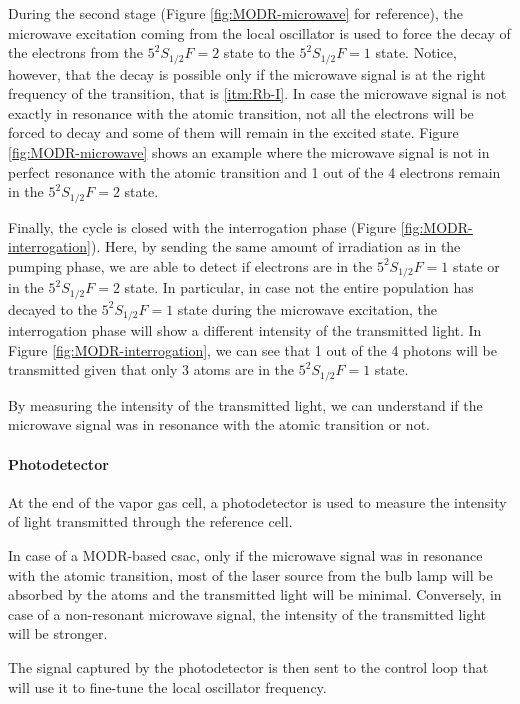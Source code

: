 During the second stage (Figure \ref{fig:MODR-microwave} for reference), the microwave excitation coming from the local oscillator is used to force the decay of the electrons from the $5^2S_{1/2} F=2$ state to the $5^2S_{1/2} F=1$ state.
Notice, however, that the decay is possible only if the microwave signal is at the right frequency of the transition, that is \ref{itm:Rb-I}.
In case the microwave signal is not exactly in resonance with the atomic transition, not all the electrons will be forced to decay and some of them will remain in the excited state.
Figure \ref{fig:MODR-microwave} shows an example where the microwave signal is not in perfect resonance with the atomic transition and 1 out of the 4 electrons remain in the $5^2S_{1/2} F=2$ state.

Finally, the cycle is closed with the interrogation phase (Figure \ref{fig:MODR-interrogation}).
Here, by sending the same amount of irradiation as in the pumping phase, we are able to detect if electrons are in the $5^2S_{1/2} F=1$ state or in the $5^2S_{1/2} F=2$ state.
In particular, in case not the entire population has decayed to the $5^2S_{1/2} F=1$ state during the microwave excitation, the interrogation phase will show a different intensity of the transmitted light.
In Figure \ref{fig:MODR-interrogation}, we can see that 1 out of the 4 photons will be transmitted given that only 3 atoms are in the $5^2S_{1/2} F=1$ state.

By measuring the intensity of the transmitted light, we can understand if the microwave signal was in resonance with the atomic transition or not.


\paragraph{Photodetector}

At the end of the vapor gas cell, a photodetector is used to measure the intensity of light transmitted through the reference cell.

In case of a MODR-based \acrshort{csac}, only if the microwave signal was in resonance with the atomic transition, most of the laser source from the bulb lamp will be absorbed by the atoms and the transmitted light will be minimal.
Conversely, in case of a non-resonant microwave signal, the intensity of the transmitted light will be stronger.

The signal captured by the photodetector is then sent to the control loop that will use it to fine-tune the local oscillator frequency.
